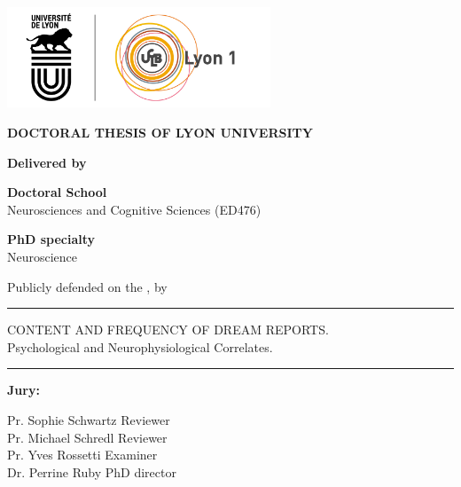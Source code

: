\begin{titlepage}

  \setlength{\parindent}{0pt}
  \thispagestyle{empty}

  \begin{center}
  \includegraphics[height=3cm]{content/logo}
  \end{center}

  \bigskip

  \begin{center}
  \fontsize{14pt}{16pt}\selectfont
  \textbf{\uppercase{DOCTORAL THESIS OF LYON UNIVERSITY}} \\

  \bigskip

  \fontsize{12pt}{14pt}\selectfont
  \textbf{Delivered by}\\ \medskip
  \thesisUniversity

  \textbf{Doctoral School}\\ \medskip
  Neurosciences and Cognitive Sciences (ED476)

  \textbf{PhD specialty}\\ \medskip
  Neuroscience

  Publicly defended on the \thesisDate, by \\ \medskip
  \fontsize{14pt}{16pt}\selectfont
  \textbf{\thesisName}

  \rule{\textwidth}{0.5pt}

  \fontsize{16pt}{20pt}\selectfont
  CONTENT AND FREQUENCY OF DREAM REPORTS.\\ \medskip
  Psychological and Neurophysiological Correlates.
  \rule{\textwidth}{0.5pt}

  \end{center}

  \fontsize{12pt}{14pt}\selectfont
  \textbf{Jury:}

  Pr. Sophie Schwartz  	\hfill Reviewer\\
  Pr. Michael Schredl 	\hfill Reviewer\\
  Pr. Yves Rossetti 	\hfill Examiner\\
  Dr. Perrine Ruby 		\hfill PhD director\\

  \vfill

\end{titlepage}
